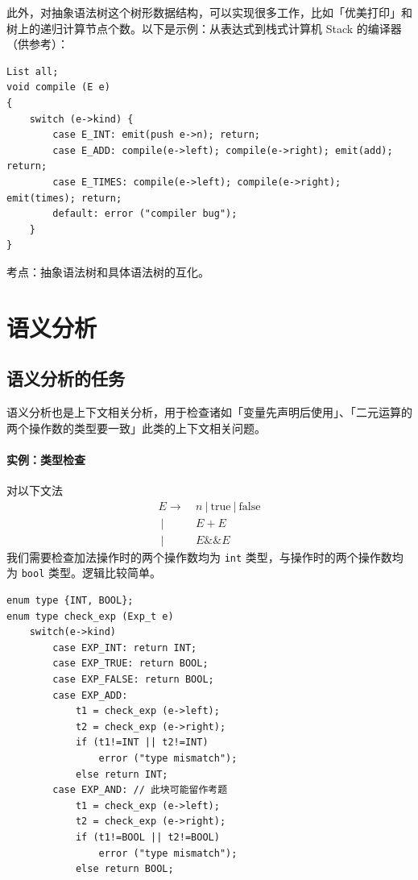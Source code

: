 \documentclass[UTF8]{ctexart}
\newcommand\OR{\ |\ }
\newcommand\Emph[1]{\textcolor{cyan!80!black}{#1}}
\begin{document}
此外，对抽象语法树这个树形数据结构，可以实现很多工作，比如「优美打印」和树上的递归计算节点个数。以下是示例：从表达式到栈式计算机 Stack 的编译器（供参考）：
\begin{lstlisting}
List all; 
void compile (E e)
{
    switch (e->kind) {
        case E_INT: emit(push e->n); return;
        case E_ADD: compile(e->left); compile(e->right); emit(add); return;
        case E_TIMES: compile(e->left); compile(e->right); emit(times); return;
        default: error ("compiler bug");
    }
}
\end{lstlisting}

\Emph{考点}：抽象语法树和具体语法树的互化。

\section{语义分析}
\subsection{语义分析的任务}
\Emph{语义分析}也是上下文相关分析，用于检查诸如「变量先声明后使用」、「二元运算的两个操作数的类型要一致」此类的上下文相关问题。

\paragraph{实例：类型检查} 对以下文法
\begin{equation}\label{eq:G-type}
\begin{split}
   E\to\  & n \OR \text{true} \OR \text{false} \\
    \OR & E+E \\
    \OR & E \&\& E 
\end{split}
\end{equation}
我们需要检查加法操作时的两个操作数均为 \verb!int! 类型，与操作时的两个操作数均为 \verb!bool! 类型。逻辑比较简单。

\begin{lstlisting}
enum type {INT, BOOL};
enum type check_exp (Exp_t e)
    switch(e->kind)
        case EXP_INT: return INT;
        case EXP_TRUE: return BOOL;
        case EXP_FALSE: return BOOL;
        case EXP_ADD: 
            t1 = check_exp (e->left);
            t2 = check_exp (e->right);
            if (t1!=INT || t2!=INT)
                error ("type mismatch");
            else return INT;
        case EXP_AND: // 此块可能留作考题
            t1 = check_exp (e->left);
            t2 = check_exp (e->right);
            if (t1!=BOOL || t2!=BOOL)
                error ("type mismatch");
            else return BOOL;
\end{lstlisting}
\end{document}
